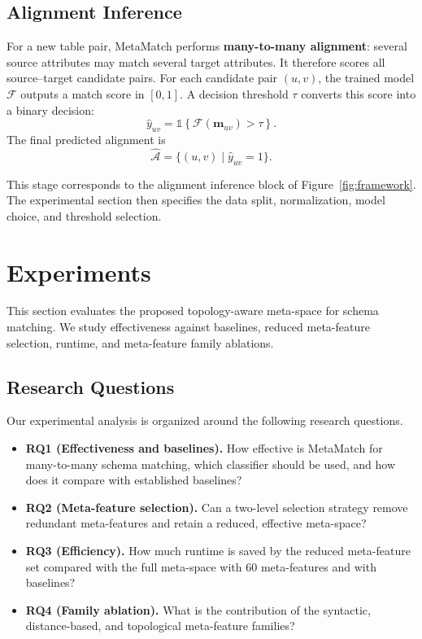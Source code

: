 \documentclass[sigconf, nonacm]{acmart}
\begin{document}
\subsection{\textbf{Alignment Inference}}

For a new table pair, MetaMatch performs \textbf{many-to-many alignment}: several source attributes may match several target attributes. It therefore scores all source--target candidate pairs. For each candidate pair \((u,v)\), the trained model \(\mathcal{F}\) outputs a match score in \([0,1]\). A decision threshold \(\tau\) converts this score into a binary decision:
\[
\hat{y}_{uv}=\mathds{1}\!\left\{\mathcal{F}(\mathbf{m}_{uv})>\tau\right\}.
\]
The final predicted alignment is
\[
\widehat{\mathcal{A}}=\{(u,v)\mid \hat{y}_{uv}=1\}.
\]

This stage corresponds to the alignment inference block of Figure~\ref{fig:framework}. The experimental section then specifies the data split, normalization, model choice, and threshold selection.

\section{Experiments}
\label{sec:experiments}

This section evaluates the proposed topology-aware meta-space for schema matching. We study effectiveness against baselines, reduced meta-feature selection, runtime, and meta-feature family ablations.

\subsection{Research Questions}

Our experimental analysis is organized around the following research questions.
\begin{itemize}[leftmargin=*]
    \item \textbf{RQ1 (Effectiveness and baselines).} How effective is MetaMatch for many-to-many schema matching, which classifier should be used, and how does it compare with established baselines?
    \item \textbf{RQ2 (Meta-feature selection).} Can a two-level selection strategy remove redundant meta-features and retain a reduced, effective meta-space?
    \item \textbf{RQ3 (Efficiency).} How much runtime is saved by the reduced meta-feature set compared with the full meta-space with 60 meta-features and with baselines?
    \item \textbf{RQ4 (Family ablation).} What is the contribution of the syntactic, distance-based, and topological meta-feature families?
\end{itemize}
\end{document}
